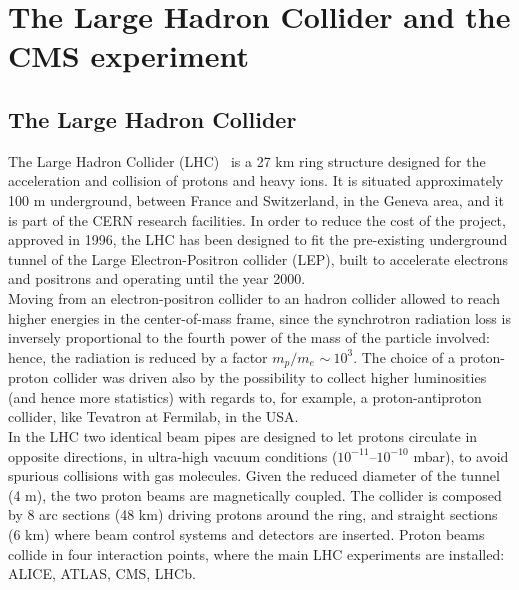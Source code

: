 \chapter{The Large Hadron Collider and the CMS experiment}
\label{chap:LHC_CMS}


\section{The Large Hadron Collider}
The Large Hadron Collider (LHC)~\cite{Evans:2008zzb} is a 27 km ring structure designed for the acceleration and collision of protons and heavy ions. It is situated approximately 100 m underground, between France and Switzerland, in the Geneva area, and it is part of the CERN %
research facilities. In order to reduce the cost of the project, approved in 1996, the LHC has been designed to fit the pre-existing underground tunnel of the Large Electron-Positron collider (LEP), built to accelerate electrons and positrons and operating until the year 2000.\\
Moving from an electron-positron collider to an hadron collider allowed to reach higher energies in the center-of-mass frame, since the synchrotron radiation loss is inversely proportional to the fourth power of the mass of the particle involved: hence, the radiation is reduced by a factor $m_p/m_e$ $\sim~10^3$. The choice of a proton-proton collider was driven also by the possibility to collect higher luminosities (and hence more statistics) with regards to, for example, a proton-antiproton collider, like Tevatron at Fermilab, in the USA.\\
In the LHC two identical beam pipes are designed to let protons circulate in opposite directions, in ultra-high vacuum conditions ($10^{-11}$--$10^{-10}$ mbar), to avoid spurious collisions with gas molecules. Given the reduced diameter of the tunnel (4 m), the two proton beams are magnetically coupled. The collider is composed by 8 arc sections (48 km) driving protons around the ring, and straight sections (6 km) where beam control systems and detectors are inserted. Proton beams collide in four interaction points, where the main LHC experiments are installed: ALICE, ATLAS, CMS, LHCb.

